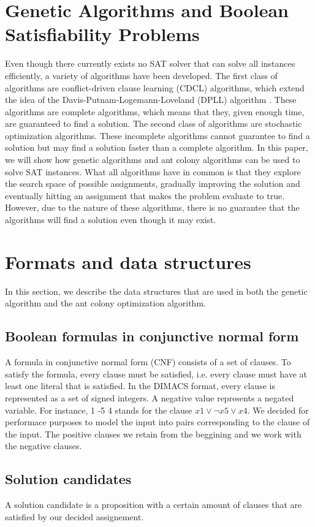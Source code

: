 \documentclass{article}
\begin{document}
\section{Genetic Algorithms and Boolean Satisfiability Problems}
Even though there currently exists no SAT solver that can solve all instances
efficiently, a variety of algorithms have been developed. The first class of algorithms are conflict-driven clause learning (CDCL) algorithms, which extend
the idea of the Davis-Putnam-Logemann-Loveland (DPLL) algorithm \cite{ref1}. These
algorithms are complete algorithms, which means that they, given enough time,
are guaranteed to find a solution. The second class of algorithms are stochastic
optimization algorithms. These incomplete algorithms cannot guarantee to find
a solution but may find a solution faster than a complete algorithm. In this paper, we will show how genetic algorithms and ant colony algorithms can be used
to solve SAT instances. What all algorithms have in common is that they explore the search space of possible assignments, gradually improving the solution
and eventually hitting an assignment that makes the problem evaluate to true.
However, due to the nature of these algorithms, there is no guarantee that the
algorithms will find a solution even though it may exist.

\section{Formats and data structures}
In this section, we describe the data structures that are used in both the genetic
algorithm and the ant colony optimization algorithm.
\subsection{Boolean formulas in conjunctive normal form}
A formula in conjunctive normal form (CNF) consists of a set of clauses. To
satisfy the formula, every clause must be satisfied, i.e. every clause must have at
least one literal that is satisfied.
In the DIMACS format, every clause is represented as a set of signed integers.
A negative value represents a negated variable. For instance, 1 -5 4 stands for
the clause $x1 \lor \neg x5 \lor x4$.
We decided for performace purposes to model the input into pairs corresponding to 
the clause of the input. 
The positive clauses we retain from the beggining and we work with the negative clauses.

\subsection {Solution candidates}
A solution candidate is a proposition with a certain amount of clauses that are satisfied by our decided assignement.
\end{document}
